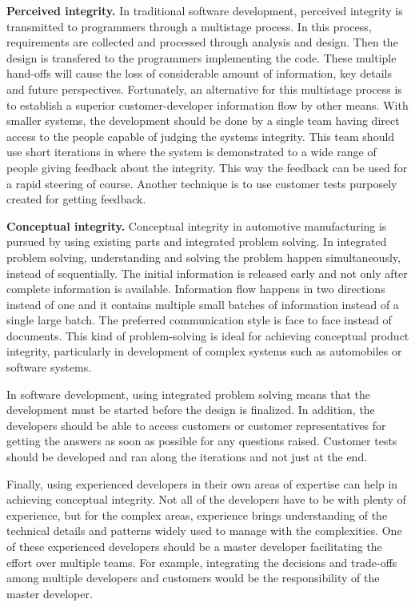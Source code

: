 \textbf{Perceived integrity.} In traditional software development, perceived integrity is transmitted to programmers through a multistage process. In this process, requirements are collected and processed through analysis and design. Then the design is transfered to the programmers implementing the code. These multiple hand-offs will cause the loss of considerable amount of information, key details and future perspectives. Fortunately, an alternative for this multistage process is to establish a superior customer-developer information flow by other means. With smaller systems, the development should be done by a single team having direct access to the people capable of judging the systems integrity. This team should use short iterations in where the system is demonstrated to a wide range of people giving feedback about the integrity. This way the feedback can be used for a rapid steering of course. Another technique is to use customer tests purposely created for getting feedback.~\cite{poppendieck2003LSD}

\textbf{Conceptual integrity.}
Conceptual integrity in automotive manufacturing is pursued by using existing parts and integrated problem solving. In integrated problem solving, understanding and solving the problem happen simultaneously, instead of sequentially. The initial information is released early and not only after complete information is available. Information flow happens in two directions instead of one and it contains multiple small batches of information instead of a single large batch. The preferred communication style is face to face instead of documents. This kind of problem-solving is ideal for achieving conceptual product integrity, particularly in development of complex systems such as automobiles or software systems.~\cite{poppendieck2003LSD}

In software development, using integrated problem solving means that the development must be started before the design is finalized. In addition, the developers should be able to access customers or customer representatives for getting the answers as soon as possible for any questions raised. Customer tests should be developed and ran along the iterations and not just at the end.~\cite{poppendieck2003LSD}

Finally, using experienced developers in their own areas of expertise can help in achieving conceptual integrity. Not all of the developers have to be with plenty of experience, but for the complex areas, experience brings understanding of the technical details and patterns widely used to manage with the complexities. One of these experienced developers should be a master developer facilitating the effort over multiple teams. For example, integrating the decisions and trade-offs among multiple developers and customers would be the responsibility of the master developer.~\cite{poppendieck2003LSD}

